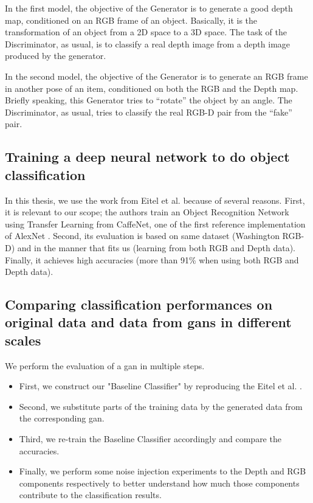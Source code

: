 In the first model, the objective of the Generator is to generate a good depth map,
conditioned on an RGB frame of an object. Basically, it is the transformation of an object
from a 2D space to a 3D space. The task of the Discriminator, as usual, is to classify a
real depth image from a depth image produced by the generator.

In the second model, the objective of the Generator is to generate an RGB frame in
another pose of an item, conditioned on both the RGB and the Depth map. Briefly speaking,
this Generator tries to ``rotate'' the object by an angle. The Discriminator, as usual,
tries to classify the real RGB-D pair from the ``fake'' pair.

\subsection{Training a deep neural network to do object classification}
In this thesis, we use the work from Eitel et al. \cite{eitel} because of several
reasons. First, it is relevant to our scope; the authors train an Object Recognition
Network using Transfer Learning from CaffeNet, one of the first reference implementation
of AlexNet \cite{alexnet}. Second, its
evaluation is based on same dataset (Washington RGB-D) and in the manner that fits us
(learning from both RGB and Depth data). Finally, it achieves high accuracies (more than
91\% when using both RGB and Depth data).

\subsection{Comparing classification performances on original data and data from
	\acrshort{gan}s in different scales}

We perform the evaluation of a \acrshort{gan} in multiple steps. 

\begin{itemize}
	\item First, we construct our
		"Baseline Classifier" by reproducing the Eitel et al. \cite{eitel}.
	\item Second, we substitute parts of the training data by the generated data from the corresponding
		\acrshort{gan}.
	\item Third, we re-train the Baseline Classifier accordingly and compare the
		accuracies.
	\item Finally, we perform some noise injection experiments to the Depth and RGB components
		respectively to better understand how much those components contribute to the
		classification results.
\end{itemize}

